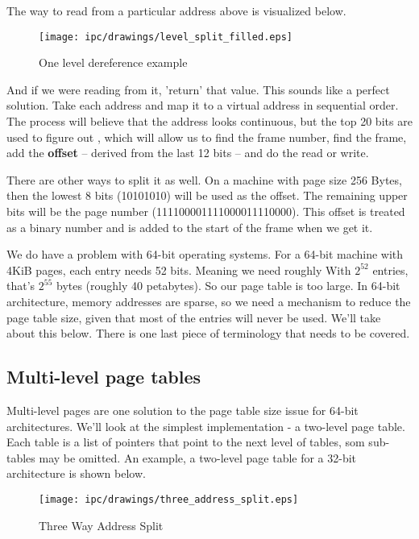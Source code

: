 	The way to read from a particular address above is visualized below.
	 
	\begin{figure}[H]
	 \centering
	 \texttt{[image: ipc/drawings/level\_split\_filled.eps]}
	 \caption{One level dereference example}
	\end{figure}
	 
	And if we were reading from it, 'return' that value.
	This sounds like a perfect solution.
	Take each address and map it to a virtual address in sequential order.
	The process will believe that the address looks continuous, but the top 20 bits are used to figure out ,
	which will allow us to find the frame number, find the frame, add the \textbf{offset} -- derived from the last 12 bits -- and do the read or write.
	 
	There are other ways to split it as well.
	On a machine with page size 256 Bytes, then the lowest 8 bits (10101010) will be used as the offset.
	The remaining upper bits will be the page number (111100001111000011110000). This offset is treated as a binary number and is added to the start of the frame when we get it.
	 
	We do have a problem with 64-bit operating systems.
	For a 64-bit machine with 4KiB pages, each entry needs 52 bits.
	Meaning we need roughly
	With $2^{52}$ entries, that's $2^{55}$ bytes (roughly 40 petabytes).
	So our page table is too large.
	In 64-bit architecture, memory addresses are sparse, so we need a mechanism to reduce the page table size, given that most of the entries will never be used.
	We'll take about this below. There is one last piece of terminology that needs to be covered.
	 
	\subsection{Multi-level page tables}
	 
	Multi-level pages are one solution to the page table size issue for 64-bit architectures.
	We'll look at the simplest implementation - a two-level page table.
	Each table is a list of pointers that point to the next level of tables, som sub-tables may be omitted.
	An example, a two-level page table for a 32-bit architecture is shown below.
	 
	\begin{figure}[H]
	\centering
	\texttt{[image: ipc/drawings/three\_address\_split.eps]}
	\caption{Three Way Address Split}
	\end{figure}
	 
